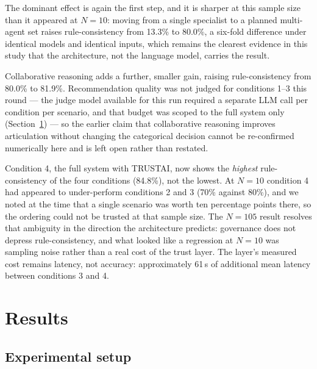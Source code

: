 \documentclass[preprint,12pt]{elsarticle}
\begin{document}
The dominant effect is again the first step, and it is sharper at this
sample size than it appeared at $N=10$: moving from a single specialist to
a planned multi-agent set raises rule-consistency from 13.3\% to 80.0\%, a
six-fold difference under identical models and identical inputs, which
remains the clearest evidence in this study that the architecture, not the
language model, carries the result.

Collaborative reasoning adds a further, smaller gain, raising
rule-consistency from 80.0\% to 81.9\%. Recommendation quality was not
judged for conditions 1--3 this round --- the judge model available for
this run required a separate LLM call per condition per scenario, and that
budget was scoped to the full system only (Section~\ref{sec:results}) ---
so the earlier claim that collaborative reasoning improves articulation
without changing the categorical decision cannot be re-confirmed
numerically here and is left open rather than restated.

Condition 4, the full system with TRUSTAI, now shows the \emph{highest}
rule-consistency of the four conditions (84.8\%), not the lowest. At
$N=10$ condition 4 had appeared to under-perform conditions 2 and 3 (70\%
against 80\%), and we noted at the time that a single scenario was worth
ten percentage points there, so the ordering could not be trusted at that
sample size. The $N=105$ result resolves that ambiguity in the direction
the architecture predicts: governance does not depress rule-consistency,
and what looked like a regression at $N=10$ was sampling noise rather than
a real cost of the trust layer. The layer's measured cost remains
latency, not accuracy: approximately 61\,s of additional mean latency
between conditions 3 and 4.

\section{Results}
\label{sec:results}

\subsection{Experimental setup}
\end{document}
